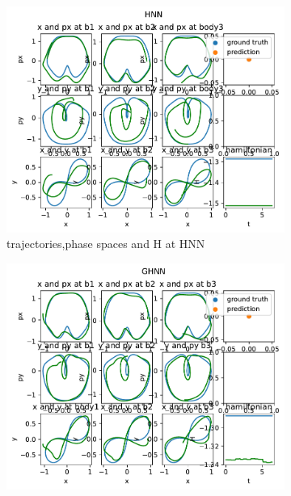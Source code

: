 \begin{figure}[H]
	\centering
	\begin{subfigure}[b]{0.3\textwidth}
		\centering
		\includegraphics[width=\textwidth]{chapters/chapter5/figonly_hnn_traj.pdf}
		\caption{trajectories,phase spaces and H at HNN}
		\label{fig:image4}
	\end{subfigure}
	\hfill
	\begin{subfigure}[b]{0.3\textwidth}
		\centering
		\includegraphics[width=\textwidth]{chapters/chapter5/figonly_ghnn_traj.pdf}

\end{subfigure}
\end{figure}
